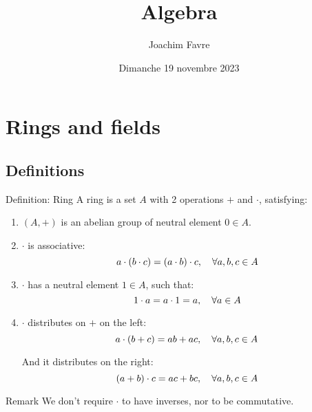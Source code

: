 \documentclass[a4paper]{article}
\title{Algebra}
\author{Joachim Favre}
\date{Dimanche 19 novembre 2023}
\begin{document}
\maketitle


\section{Rings and fields}
\subsection{Definitions}


\begin{parag}{Definition: Ring}
    A ring is a set $A$ with 2 operations $+$ and $\cdot $, satisfying:
    \begin{enumerate}
        \item $\left(A, +\right)$ is an abelian group of neutral element $0 \in A$.
        \item $\cdot $ is associative: 
        \[a\cdot \left(b\cdot c\right) = \left(a\cdot b\right)\cdot c, \mathspace \forall a,b,c \in A\]
        \item $\cdot $ has a neutral element $1 \in A$, such that:
        \[1\cdot a = a\cdot 1 = a, \quad \forall a \in A\]
        \item $\cdot $ distributes on $+$ on the left: 
        \[a\cdot \left(b+c\right) =  ab + ac, \mathspace \forall a, b, c \in A\]

        And it distributes on the right: 
        \[\left(a + b\right)\cdot c = ac + bc, \mathspace \forall a, b, c \in A\]
    \end{enumerate}
    
    \begin{subparag}{Remark}
        We don't require $\cdot $ to have inverses, nor to be commutative.
    \end{subparag}
\end{parag}
\end{document}
